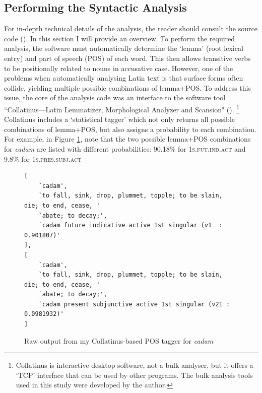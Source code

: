 \documentclass[11pt,a4paper]{scrartcl} %
\begin{document}
\subsection{Performing the Syntactic Analysis}
For in-depth technical details of the analysis, the reader should consult the source code (\cite{ovvo}). In this section I will provide an overview. To perform the required analysis, the software must automatically determine the `lemma' (root lexical entry) and part of speech (POS) of each word. This then allows transitive verbs to be positionally related to nouns in accusative case. However, one of the problems when automatically analysing Latin text is that surface forms often collide, yielding multiple possible combinations of lemma+POS. To address this issue, the core of the analysis code was an interface to the software tool ``Collatinus---Latin Lemmatizer, Morphological Analyzer and Scansion" (\cite{collat}).%
\footnote{Collatinus is interactive desktop software, not a bulk analyser, but it offers a `TCP' interface that can be used by other programs. The bulk analysis tools used in this study were developed by the author.}
Collatinus includes a `statistical tagger' which not only returns all possible combinations of lemma+POS, but also assigns a probability to each combination. For example, in Figure \ref{fig:cadam}, note that the two possible lemma+POS combinations for \textit{cadam} are listed with different probabilities: 90.18\% for \textsc{1s.fut.ind.act} and 9.8\% for \textsc{1s.pres.subj.act}

\begin{figure}[H]
\centering
\caption{Raw output from my Collatinus-based POS tagger for \textit{cadam}}
\label{fig:cadam}
\phantom{xxx}
\begin{Verbatim}[fontsize=\footnotesize]
[
    `cadam',
    `to fall, sink, drop, plummet, topple; to be slain, die; to end, cease, '
    `abate; to decay;',
    `cadam future indicative active 1st singular (v1  : 0.901807)'
],
[
    `cadam',
    `to fall, sink, drop, plummet, topple; to be slain, die; to end, cease, '
    `abate; to decay;',
    `cadam present subjunctive active 1st singular (v21 : 0.0981932)'
]
\end{Verbatim}
\end{figure}
\end{document}
